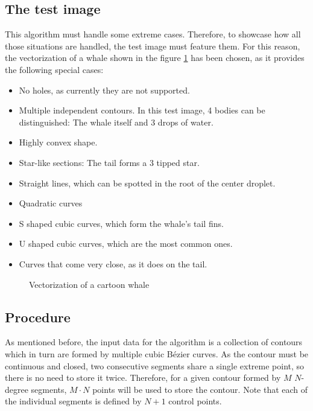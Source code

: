 \documentclass[\topdir/main.tex]{subfiles}
\begin{document}
\subsection{The test image}
This algorithm must handle some extreme cases. Therefore, to showcase how all those situations are handled, the test image must feature them. For this reason, the vectorization of a whale shown in the figure \ref{fig:a01:whale} has been chosen, as it provides the following special cases:

\begin{itemize}
    \item No holes, as currently they are not supported.
    \item Multiple independent contours. In this test image, 4 bodies can be distinguished: The whale itself and 3 drops of water.
    \item Highly convex shape.
    \item Star-like sections: The tail forms a 3 tipped star.
    \item Straight lines, which can be spotted in the root of the center droplet.
    \item Quadratic curves
    \item S shaped cubic curves, which form the whale's tail fins.
    \item U shaped cubic curves, which are the most common ones.
    \item Curves that come very close, as it does on the tail.
\end{itemize}

\begin{figure}[hbtp]
    \centering

    \caption{Vectorization of a cartoon whale}
    \label{fig:a01:whale}
\end{figure}

\subsection{Procedure}
As mentioned before, the input data for the algorithm is a collection of contours which in turn are formed by multiple cubic Bézier curves. As the contour must be continuous and closed, two consecutive segments share a single extreme point, so there is no need to store it twice. Therefore, for a given contour formed by $M$ $N$-degree segments, $M \cdot N$ points will be used to store the contour. Note that each of the individual segments is defined by $N+1$ control points.\newline 
\end{document}
